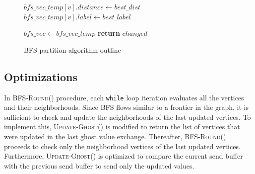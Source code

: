 \documentclass[conference]{IEEEtran}
\begin{document}
\begin{figure}
\begin{algorithmic}[1]
            \EndIf
            \EndFor
        \State $bfs\_vec\_temp[v].distance \gets best\_dist$
        \State $bfs\_vec\_temp[v].label \gets best\_label$

        \EndFor
        \State $bfs\_vec \gets bfs\_vec\_temp$
    \EndWhile
    \State \textbf{return} $changed$
    \EndProcedure


    \end{algorithmic}  
    \caption{BFS partition algorithm outline}  
    \label{algo:bfs-par-outline}  
\end{figure}

\subsection{Optimizations}
In \textsc{BFS-Round()} procedure, each \verb|while| loop iteration evaluates all the vertices and their neighborhoods. Since BFS flows similar to a frontier in the graph, it is sufficient to check and update the neighborhoods of the last updated vertices. To implement this, \textsc{Update-Ghost()} is modified to return the list of vertices that were updated in the last ghost value exchange. Thereafter, \textsc{BFS-Round()} proceeds to check only the neighborhood vertices of the last updated vertices. Furthermore, \textsc{Update-Ghost()} is optimized to compare the current send buffer with the previous send buffer to send only the updated values.




\end{document}
